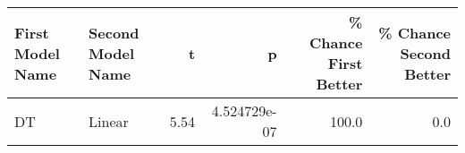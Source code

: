 \begin{tabular}{llrrrr}
\toprule
First Model Name & Second Model Name &    t &            p &  \% Chance First Better &  \% Chance Second Better \\
\midrule
              DT &            Linear & 5.54 & 4.524729e-07 &                  100.0 &                     0.0 \\
\bottomrule
\end{tabular}
